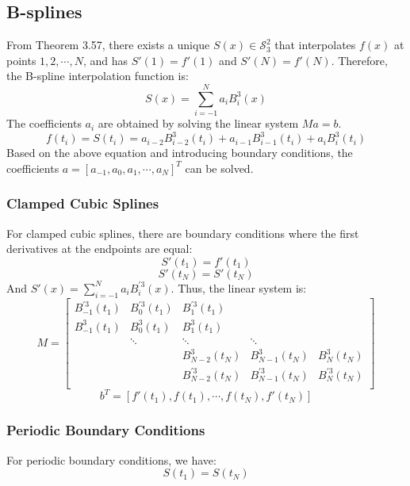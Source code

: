 \documentclass[a4paper]{article}
\begin{document}
\subsection{B-splines}
From Theorem 3.57, there exists a unique $S(x)\in \mathcal{S}_3^2$ that interpolates $f(x)$ at points $1,2,\cdots,N$, and has $S'(1)=f'(1)$ and $S'(N) = f'(N)$. Therefore, the B-spline interpolation function is:
\begin{equation}
    S(x) = \sum_{i=-1}^{N}a_i B_{i}^3(x)
\end{equation}
The coefficients $a_i$ are obtained by solving the linear system $Ma=b$.
\begin{equation}
    f(t_i)=S(t_i) = a_{i-2}B^3_{i-2}(t_i)+a_{i-1}B^3_{i-1}(t_i)+a_{i}B^3_{i}(t_i)
\end{equation}
Based on the above equation and introducing boundary conditions, the coefficients $a= [a_{-1},a_0,a_1,\cdots,a_{N}]^T$ can be solved.
\subsubsection{Clamped Cubic Splines}
For clamped cubic splines, there are boundary conditions where the first derivatives at the endpoints are equal:
\begin{equation}
    S'(t_1)= f'(t_1)
\end{equation}
\begin{equation}
    S'(t_N) = S'(t_N)
\end{equation}
And $S'(x) = \sum_{i=-1}^{N}a_i B_i^{\prime 3}(x)$.
Thus, the linear system is:
\begin{equation}
    M = \begin{bmatrix}
        B_{-1}^{\prime 3}(t_1)& B_{0}^{\prime 3}(t_1) &B_{1}^{\prime 3}(t_1)\\
        B_{-1}^3(t_1) &B_{0}^3(t_1)&B_{1}^3(t_1)\\
        &\ddots &\ddots&\ddots&\\
        &&B_{N-2}^3(t_N)&B_{N-1}^3(t_N)&B_{N}^3(t_N)\\
        &&B_{N-2}^{\prime 3}(t_N)&B_{N-1}^{\prime3}(t_N)&B_{N}^{\prime3}(t_N)\\
    \end{bmatrix}
\end{equation}
\begin{equation}
    b^T = [f'(t_1),f(t_1),\cdots,f(t_N),f'(t_N)]
\end{equation}

\subsubsection{Periodic Boundary Conditions}
For periodic boundary conditions, we have:
\begin{equation}
    S(t_1) = S(t_N)
\end{equation}
\end{document}
